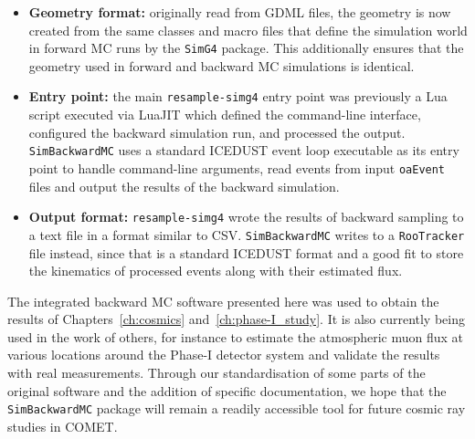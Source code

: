 \begin{itemize}
    \item {\bfseries Geometry format:} originally read from GDML files, the
    geometry is now created from the same classes and macro files that define
    the simulation world in forward MC runs by the \texttt{SimG4} package. This
    additionally ensures that the geometry used in forward and backward MC
    simulations is identical.
    \item {\bfseries Entry point:} the main \texttt{resample-simg4} entry point
    was previously a Lua script executed via LuaJIT which defined the
    command-line interface, configured the backward simulation run, and
    processed the output. \texttt{SimBackwardMC} uses a standard ICEDUST event
    loop executable as its entry point to handle command-line arguments, read
    events from input \texttt{oaEvent} files and output the results of the
    backward simulation.
    \item {\bfseries Output format:} \texttt{resample-simg4} wrote the results
    of backward sampling to a text file in a format similar to CSV.
    \texttt{SimBackwardMC} writes to a \texttt{RooTracker} file instead, since
    that is a standard ICEDUST format and a good fit to store the kinematics of
    processed events along with their estimated flux.
\end{itemize}

The integrated backward MC software presented here was used to obtain the
results of Chapters~\ref{ch:cosmics} and~\ref{ch:phase-I_study}. It is also
currently being used in the work of others, for instance to estimate the
atmospheric muon flux at various locations around the Phase\nobreakdash-I detector system
and validate the results with real measurements. Through our standardisation of
some parts of the original software and the addition of specific documentation,
we hope that the \texttt{SimBackwardMC} package will remain a readily accessible
tool for future cosmic ray studies in COMET.
